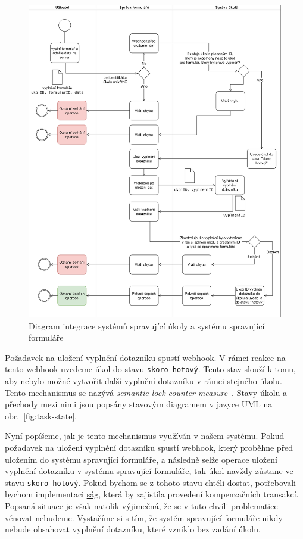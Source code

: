 \begin{figure}[H]
    \centering
    \includegraphics[width=\textwidth]{diagrams/activity.drawio}
    \caption{Diagram integrace systémů spravující úkoly a systému spravující formuláře}\label{fig:activity-diagram-task-and-form-integration}
\end{figure}

Požadavek na uložení vyplnění dotazníku spustí webhook.
V rámci reakce na tento webhook uvedeme úkol do stavu \lstinline{skoro hotový}.
Tento stav slouží k tomu, aby nebylo možné vytvořit další vyplnění dotazníku v rámci stejného úkolu.
Tento mechanismus se nazývá \emph{semantic lock counter-measure}~\cite{semantic-lock-countermeasure-def}.
Stavy úkolu a přechody mezi nimi jsou popsány stavovým diagramem v jazyce UML na obr.~\ref{fig:task-state}.

Nyní popíšeme, jak je tento mechanismus využíván v našem systému.
Pokud požadavek na uložení vyplnění dotazníku spustí webhook, který proběhne před uložením do systému spravující formuláře, a následně selže operace uložení vyplnění dotazníku v systému spravující formuláře, tak úkol navždy zůstane ve stavu \lstinline{skoro hotový}.
Pokud bychom se z tohoto stavu chtěli dostat, potřebovali bychom implementaci \href{https://microservices.io/patterns/data/saga.html}{ság}, která by zajistila provedení kompenzačních transakcí.
Popsaná situace je však natolik výjimečná, že se v tuto chvíli problematice věnovat nebudeme.
Vystačíme si s tím, že systém spravující formuláře nikdy nebude obsahovat vyplnění dotazníku, které vzniklo bez zadání úkolu.

